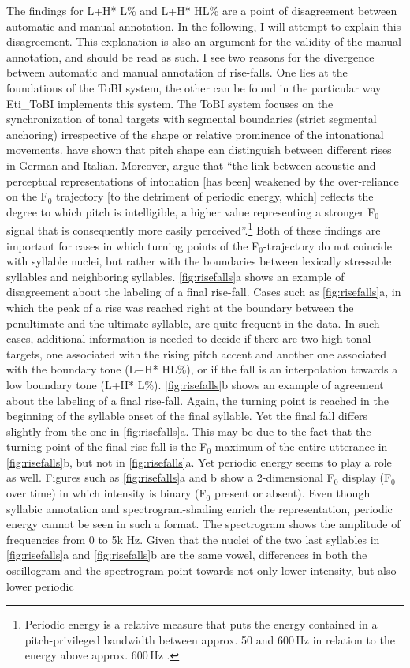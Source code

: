 The findings for L+H* L\% and L+H* HL\% are a point of disagreement between automatic and manual annotation. In the following, I will attempt to explain this disagreement. This explanation is also an argument for the validity of the manual annotation, and should be read as such. I see two reasons for the divergence between automatic and manual annotation of rise-falls. One lies at the foundations of the ToBI system, the other can be found in the particular way Eti\_ToBI implements this system. The ToBI system focuses on the synchronization of tonal targets with segmental boundaries (strict segmental anchoring) irrespective of the shape or relative prominence of the intonational movements. \citet{NiebuhrETAL.2011} have shown that pitch shape can distinguish between different rises in German and Italian. Moreover, \citet[804]{AlbertCangemiGrice.2018} argue that ``the link between acoustic and perceptual representations of intonation [has been] weakened by the over-reliance on the F$_0$ trajectory [to the detriment of periodic energy, which] reflects the degree to which pitch is intelligible, a higher value representing a stronger F$_0$ signal that is consequently more easily perceived''.\footnote{Periodic energy is a relative measure that puts the energy contained in a pitch-privileged bandwidth between approx. 50 and 600\,Hz in relation to the energy above approx. 600\,Hz \citep[805]{AlbertCangemiGrice.2018}.} Both of these findings are important for cases in which turning points of the F$_0$-trajectory do not coincide with syllable nuclei, but rather with the boundaries between lexically stressable syllables and neighboring syllables. \autoref{fig:risefalls}a shows an example of disagreement about the labeling of a final rise-fall. Cases such as \autoref{fig:risefalls}a, in which the peak of a rise was reached right at the boundary between the penultimate and the ultimate syllable, are quite frequent in the data. In such cases, additional information is needed to decide if there are two high tonal targets, one associated with the rising pitch accent and another one associated with the boundary tone (L+H* HL\%), or if the fall is an interpolation towards a low boundary tone (L+H* L\%). \autoref{fig:risefalls}b shows an example of agreement about the labeling of a final rise-fall. Again, the turning point is reached in the beginning of the syllable onset of the final syllable. Yet the final fall differs slightly from the one in \autoref{fig:risefalls}a. This may be due to the fact that the turning point of the final rise-fall is the F$_0$-maximum of the entire utterance in \autoref{fig:risefalls}b, but not in \autoref{fig:risefalls}a. Yet periodic energy seems to play a role as well. Figures such as \autoref{fig:risefalls}a and b show a 2-dimensional F$_0$ display (F$_0$ over time) in which intensity is binary (F$_0$ present or absent). Even though syllabic annotation and spectrogram-shading enrich the representation, periodic energy cannot be seen in such a format. The spectrogram shows the amplitude of frequencies from 0 to 5k Hz. Given that the nuclei of the two last syllables in \autoref{fig:risefalls}a and \autoref{fig:risefalls}b are the same vowel, differences in both the oscillogram and the spectrogram point towards not only lower intensity, but also lower periodic 